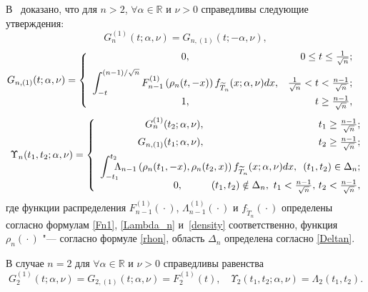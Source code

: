 В~\cite{ShirIIZVUZ2017} доказано, что для $n>2$, $\forall \alpha\in \mathbb R$ и $\nu>0$ справедливы следующие утверждения: {\small
\begin{equation}\label{Gvtheorem}
G_{n}^{(1)}(t;\alpha,\nu)=G_{n,(1)}(t;-\alpha,\nu),
\end{equation}
\begin{equation*}
\label{Gntheorem} 
\hspace{-2mm}
G_{n,(1)}(t;\alpha,\nu)=
\left\{ 
\begin{array}{cr}
0, & 0\le t\le \frac{1}{\sqrt{n}};\\[2mm]
\displaystyle 
\int _{-t}^{({n-1})/{\sqrt{n}}}F_{n-1}^{(1)}\left(\rho_n(t,-x)\right)
f_{\widetilde{T}_n}(x;\alpha,\nu)dx, & 
\frac{1}{\sqrt{n}}<t<\frac{n-1}{\sqrt{n}};\\[2mm]
1, & t\ge\frac{n-1}{\sqrt{n}},
\end{array}
\right.
\end{equation*}
\begin{equation}\label{Upsilon_n}
\Upsilon_n(t_1,t_2;\alpha,\nu)= \left\{
\begin{array}{r}
G_n^{(1)}(t_2;\alpha,\nu),\hspace{4cm}  t_1\ge\frac{n-1}{\sqrt{n}};\\[2mm]
G_{n,(1)}(t_1;\alpha,\nu),\hspace{4cm}  t_2\ge\frac{n-1}{\sqrt{n}};\\[2mm] 
\displaystyle 
\int _{-t_1}^{t_2} \!\!\!\! \Lambda_{n-1} \left(\rho_{n}(t_1,-x),\rho_{n}(t_2,x)\right)f_{\widetilde{T}_n}(x;\alpha,\nu)dx,\,\,\,(t_1,t_2)\in\Delta_n;\\
0, \hspace{1cm}   (t_1,t_2)\notin\Delta_n,\,\,
t_1<\frac{n-1}{\sqrt{n}},\,t_2<\frac{n-1}{\sqrt{n}},
\end{array}
\right. \hspace{-2mm}
\end{equation} }
где функции распределения $F_{n-1}^{(1)}({}\cdot{})$, $\Lambda_{n-1}^{(1)}({}\cdot{})$ и  $f_{\widetilde{T}_n}({}\cdot{})$  определены согласно формулам \eqref{Fn1}, \eqref{Lambda_n} и~\eqref{density} соответственно, функция $\rho_n({}\cdot{})$  "--- согласно формуле \eqref{rhon},  область $\Delta_n$ определена согласно \eqref{Deltan}.

В случае $n=2$ для $\forall \alpha \in \mathbb R$ и $\nu>0$ справедливы равенства
$$
G_2^{(1)}(t;\alpha,\nu) = G_{2,(1)}(t;\alpha,\nu)= F_2^{(1)}(t), \quad   \Upsilon_2(t_1,t_2;\alpha,\nu) = \Lambda_2(t_1,t_2).
$$


